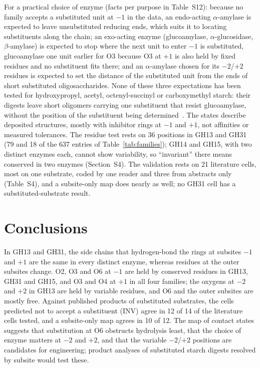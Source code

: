 \documentclass[preprint,12pt]{elsarticle}
\begin{document}
For a practical choice of enzyme (facts per purpose in Table~S12): because no family accepts a substituted unit at
$-1$ in the data, an endo-acting $\alpha$-amylase is expected to leave unsubstituted reducing ends, which suits it to
locating substituents along the chain; an exo-acting enzyme (glucoamylase, $\alpha$-glucosidase,
$\beta$-amylase) is expected to stop where the next unit to enter $-1$ is substituted, glucoamylase one unit earlier
for O3 because O3 at $+1$ is also held by fixed residues and no substituent fits there; and an $\alpha$-amylase chosen
for its $-2$/$+2$ residues is expected to set the distance of the substituted unit from the ends of short substituted
oligosaccharides. None of these three expectations has been tested for hydroxypropyl, acetyl, octenyl-succinyl or carboxymethyl
starch: their digests leave short oligomers carrying one substituent that resist glucoamylase, without the position
of the substituent being determined~\citep{Huang2007,Huijbrechts2008}. The states describe deposited structures,
mostly with inhibitor rings at $-1$ and $+1$, not affinities or measured tolerances. The residue test rests on 36 positions
in GH13 and GH31 (79 and 18 of the 637 entries of Table~\ref{tab:families}); GH14 and GH15, with two distinct enzymes each, cannot show variability, so ``invariant'' there means conserved
in two enzymes (Section~S4). The validation rests on 21 literature cells, most on one substrate, coded by one reader and
three from abstracts only (Table~S4), and a subsite-only map does nearly as well; no GH31 cell has a
substituted-substrate result.

\section{Conclusions}

In GH13 and GH31, the side chains that hydrogen-bond the rings at subsites $-1$ and $+1$ are the same in every distinct enzyme, whereas residues at the outer subsites change. O2, O3 and O6 at $-1$ are held by conserved residues in GH13, GH31
and GH15, and O3 and O4 at $+1$ in all four families; the oxygens at $-2$ and $+2$ in GH13 are held by
variable residues, and O6 and the outer subsites are mostly free. Against published products of substituted substrates,
the cells predicted not to accept a substituent (INV) agree in 12 of 14 of the literature cells tested, and a subsite-only map agrees in 10 of 12. The map of contact states
suggests that substitution at O6 obstructs hydrolysis least, that the choice of enzyme matters at $-2$ and $+2$, and that
the variable $-2$/$+2$ positions are candidates for engineering; product analyses of substituted starch digests resolved
by subsite would test these.
\end{document}
